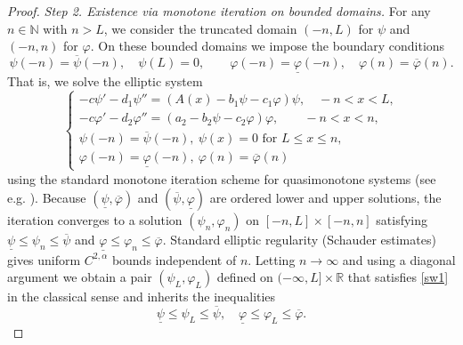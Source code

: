 \documentclass[reqno]{amsart}
\theoremstyle{plain}
\theoremstyle{definition}
\theoremstyle{remark}
\begin{document}
\begin{proof}
		\textit{Step 2. Existence via monotone iteration on bounded domains.}
		For any $n\in\mathbb{N}$ with $n>L$, we consider the truncated domain $(-n,L)$ for $\psi$ and
		$(-n,n)$ for $\varphi$.  On these bounded domains we impose the boundary conditions
		\[
		\psi(-n)=\overline\psi(-n),\quad \psi(L)=0,\qquad
		\varphi(-n)=\underline\varphi(-n),\quad \varphi(n)=\overline\varphi(n).
		\]
		That is, we solve the elliptic system
		\[
		\begin{cases}
			-c \psi' - d_1 \psi'' = (A(x) - b_1\psi - c_1\varphi)\psi, \quad-n < x < L,\\
			-c \varphi' - d_2 \varphi'' = (a_2 - b_2\psi - c_2\varphi)\varphi, \qquad -n < x < n,\\
			\psi(-n)=\overline\psi(-n), ~ \psi(x)=0 \text{ for } L \le x \le n,\\
			\varphi(-n)=\underline\varphi(-n), ~ \varphi(n)=\overline\varphi(n)
		\end{cases}
		\]
		using the standard monotone iteration scheme for
		quasimonotone systems (see e.g. \cite{MR3609207}).  Because
		$(\underline\psi,\overline\varphi)$ and $(\overline\psi,\underline\varphi)$ are
		ordered lower and upper solutions, the iteration converges to a solution
		$(\psi_n,\varphi_n)$ on $[-n,L]\times[-n,n]$ satisfying
		$\underline\psi\le\psi_n\le\overline\psi$ and $\underline\varphi\le\varphi_n\le\overline\varphi$.
		Standard elliptic regularity (Schauder estimates) gives uniform $C^{2,\alpha}$ bounds
		independent of $n$.  Letting $n\to\infty$ and using a diagonal argument we obtain a
		pair $(\psi_L,\varphi_L)$ defined on $(-\infty,L]\times\mathbb{R}$ that satisfies \eqref{sw1} in the classical sense and inherits the inequalities
		\begin{equation}\label{sw2}
			\underline\psi\le\psi_L\le\overline\psi, \quad \underline\varphi\le\varphi_L\le\overline\varphi.
		\end{equation}
		

\end{proof}
\end{document}
